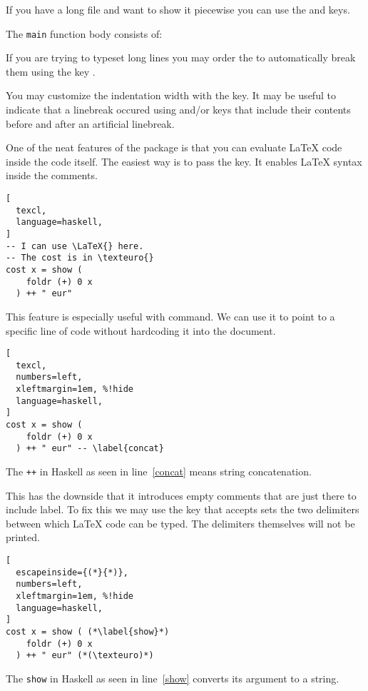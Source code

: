 If you have a long file and want to show it piecewise you can use the
 and  keys.
\begin{example}
The \lstinline|main| function
body consists of:

\end{example}

If you are trying to typeset long lines you may order the  to
automatically break them using the key .
\begin{example}

\end{example}
You may customize the indentation width with the  key. It
may be useful to indicate that a linebreak occured using 
and/or  keys that include their contents before and after an
artificial linebreak.
\begin{example}

\end{example}

One of the neat features of the  package is that you can evaluate
\LaTeX{} code inside the code itself. The easiest way is to pass the
 key. It enables \LaTeX{} syntax inside the comments.
\begin{example}
\begin{lstlisting}[
  texcl,
  language=haskell,
]
-- I can use \LaTeX{} here.
-- The cost is in \texteuro{}
cost x = show (
    foldr (+) 0 x
  ) ++ " eur"
\end{lstlisting}
\end{example}

This feature is especially useful with  command. We can use it to
point to a specific line of code without hardcoding it into the document.
\begin{example}
\begin{lstlisting}[
  texcl,
  numbers=left,
  xleftmargin=1em, %!hide
  language=haskell,
]
cost x = show (
    foldr (+) 0 x 
  ) ++ " eur" -- \label{concat}
\end{lstlisting}
The \lstinline|++| in Haskell as
seen in line~\ref{concat} means
string concatenation.
\end{example}
This has the downside that it introduces empty comments that are just there to
include label. To fix this we may use the  key that accepts
sets the two delimiters between which \LaTeX{} code can be typed. The
delimiters themselves will not be printed.
\begin{example}
  \begin{lstlisting}[
  escapeinside={(*}{*)},
  numbers=left,
  xleftmargin=1em, %!hide
  language=haskell,
]
cost x = show ( (*\label{show}*)
    foldr (+) 0 x 
  ) ++ " eur" (*(\texteuro)*)
\end{lstlisting}
The \lstinline|show| in Haskell as
seen in line~\ref{show} converts
its argument to a string.
\end{example}

